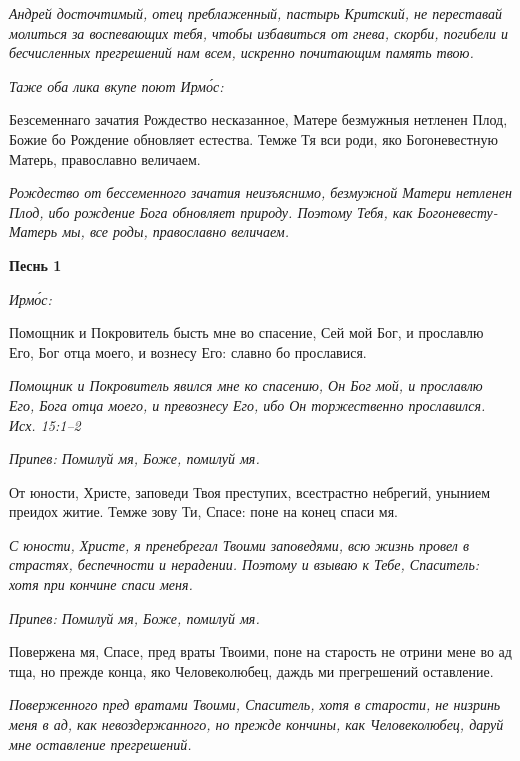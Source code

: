 \itshape Андрей досточтимый, отец преблаженный, пастырь Критский, не переставай молиться за воспевающих тебя, чтобы избавиться от гнева, скорби, погибели и бесчисленных прегрешений нам всем, искренно почитающим память твою.\normalfont{}


\itshape Таже оба лика вкупе поют Ирмо́с:\normalfont{}


Безсеменнаго зачатия Рождество несказанное, Матере безмужныя нетленен Плод, Божие бо Рождение обновляет естества. Темже Тя вси роди, яко Богоневестную Матерь, православно величаем.


\itshape Рождество от бессеменного зачатия неизъяснимо, безмужной Матери нетленен Плод, ибо рождение Бога обновляет природу. Поэтому Тебя, как Богоневесту-Матерь мы, все роды, православно величаем.\normalfont{}

\mychapterending








\bfseries Песнь 1\normalfont{}


\itshape Ирмо́с:\normalfont{}


Помощник и Покровитель бысть мне во спасение, Сей мой Бог, и прославлю Его, Бог отца моего, и вознесу Его: славно бо прославися.


\itshape Помощник и Покровитель явился мне ко спасению, Он Бог мой, и прославлю Его, Бога отца моего, и превознесу Его, ибо Он торжественно прославился. Исх. 15:1–2\normalfont{}


\itshape Припев:\normalfont{} Помилуй мя, Боже, помилуй мя.


От юности, Христе, заповеди Твоя преступих, всестрастно небрегий, унынием преидох житие. Темже зову Ти, Спасе: поне на конец спаси мя.


\itshape С юности, Христе, я пренебрегал Твоими заповедями, всю жизнь провел в страстях, беспечности и нерадении. Поэтому и взываю к Тебе, Спаситель: хотя при кончине спаси меня.\normalfont{}


\itshape Припев:\normalfont{} Помилуй мя, Боже, помилуй мя.


Повержена мя, Спасе, пред враты Твоими, поне на старость не отрини мене во ад тща, но прежде конца, яко Человеколюбец, даждь ми прегрешений оставление.


\itshape Поверженного пред вратами Твоими, Спаситель, хотя в старости, не низринь меня в ад, как невоздержанного, но прежде кончины, как Человеколюбец, даруй мне оставление прегрешений.\normalfont{}


